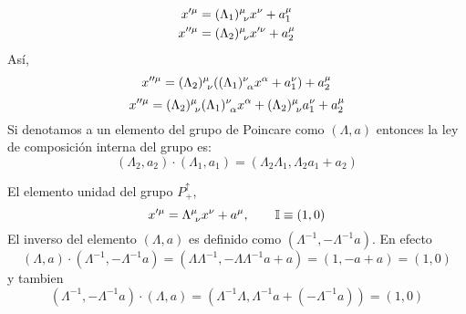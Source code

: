 \begin{align}
  x'^\mu &=(\Lambda_1)^\mu _{~\nu } x^\nu +a_1^\mu\\
  x''^\mu &=(\Lambda_2)^\mu _{~\nu } x'^\nu +a_2^\mu
\end{align}
Así, 
\begin{equation}
 x''^\mu = (\Lambda_2)^\mu_{~\nu }((\Lambda_1)^\nu_{~\alpha} x^\alpha +a_1^\nu )+a_2^\mu 
\end{equation}
\begin{equation}
  x''^\mu =(\Lambda_2)^\mu_{~\nu }(\Lambda_1)^\nu_{~\alpha }x^\alpha +(\Lambda_2)^\mu_{~\nu }a_1^\nu +a_2^\mu 
\end{equation}
Si denotamos a un elemento del grupo de Poincare como $(\Lambda,a)$ entonces la ley de composición interna del grupo es:
\begin{equation}
  \boxed{(\Lambda_2,a_2)\cdot (\Lambda_1,a_1)=(\Lambda_2\Lambda_1,\Lambda_2a_1+a_2)}
\end{equation}

El elemento unidad del grupo $P_+^\uparrow$,
\begin{equation}
  x'^\mu =\Lambda^\mu_{~\nu } x^\nu+ a^\mu ,\qquad \mathbb{I}\equiv (1,0)
\end{equation}
El inverso del elemento $(\Lambda,a)$ es definido como $(\Lambda^{-1},-\Lambda^{-1}a)$. En efecto
\begin{equation}
  (\Lambda,a)\cdot (\Lambda^{-1},-\Lambda^{-1}a)=(\Lambda\Lambda^{-1},-\Lambda\Lambda^{-1}a+a)=(1,-a+a)=(1,0)
\end{equation}
y tambien
\begin{equation}
  (\Lambda^{-1},-\Lambda^{-1}a)\cdot (\Lambda,a)=(\Lambda^{-1}\Lambda,\Lambda^{-1}a+(-\Lambda^{-1}a))=(1,0)
\end{equation}




















